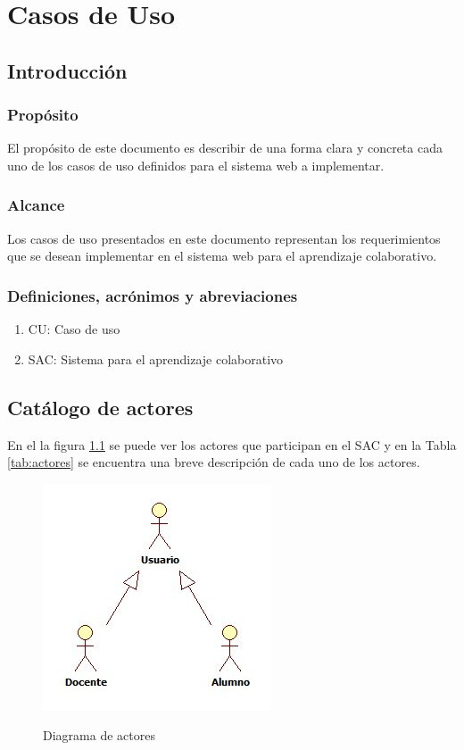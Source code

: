 \chapter{Casos de Uso}\label{apendice.A}
\section{Introducción}
\subsection{Propósito}
El propósito de este documento es describir de una forma clara y concreta cada uno de los casos de uso definidos para el sistema web a implementar.
\subsection{Alcance}
Los casos de uso presentados en este documento representan los requerimientos que se desean implementar en el sistema web para el aprendizaje colaborativo.
\subsection{Definiciones, acrónimos y abreviaciones}
\begin{enumerate}
  \item CU: Caso de uso
  \item SAC: Sistema para el aprendizaje colaborativo
\end{enumerate}
\clearpage
\section{Catálogo de actores}
En el la figura \ref{fig:actores} se puede ver los actores que participan en el SAC y en la Tabla \ref{tab:actores} se encuentra una breve descripción de cada uno de los actores.
\begin{figure}
  \centering
  \includegraphics[scale=0.6]{figuras/casosdeuso/actores.jpg}\\
  \caption[Diagrama de actores]{Diagrama de actores}
  \label{fig:actores}
\end{figure}

